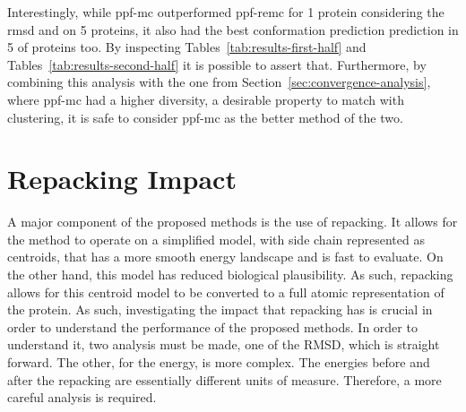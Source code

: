 Interestingly, while ppf-mc outperformed ppf-remc for 1 protein considering
the rmsd and on 5 proteins, it also had the best conformation prediction
prediction in 5 of proteins too. By inspecting
Tables~\ref{tab:results-first-half} and Tables~\ref{tab:results-second-half} it
is possible to assert that. Furthermore, by combining this analysis with the one
from Section~\ref{sec:convergence-analysis}, where ppf-mc had a higher
diversity, a desirable property to match with clustering, it is safe to consider
ppf-mc as the better method of the two.

\section{Repacking Impact} \label{sec:repacking-impact}

A major component of the proposed methods is the use of repacking. It allows for
the method to operate on a simplified model, with side chain represented as
centroids, that has a more smooth energy landscape and is fast to evaluate. On
the other hand, this model has reduced biological plausibility. As such,
repacking allows for this centroid model to be converted to a full atomic
representation of the protein. As such, investigating the impact that repacking
has is crucial in order to understand the performance of the proposed methods.
In order to understand it, two analysis must be made, one of the RMSD, which is
straight forward. The other, for the energy, is more complex. The energies before
and after the repacking are essentially different units of measure. Therefore, a
more careful analysis is required.

